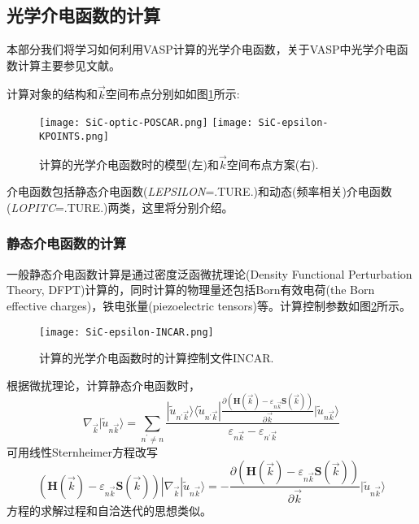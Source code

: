 \subsection{光学介电函数的计算}
本部分我们将学习如何利用\textrm{VASP}计算的光学介电函数，关于\textrm{VASP}中光学介电函数计算主要参见文献。

计算对象的结构和$\vec k$空间布点分别如如图\ref{SiC-optic-Input}所示:
\begin{figure}[h!]
\centering
\texttt{[image: SiC-optic-POSCAR.png]}
\texttt{[image: SiC-epsilon-KPOINTS.png]}
\caption{\small \textrm{计算的光学介电函数时的模型(左)和$\vec k$空间布点方案(右).}}%
\label{SiC-optic-Input}
\end{figure}

介电函数包括静态介电函数(\textrm{\textit{LEPSILON}=.TURE.})和动态(频率相关)介电函数(\textrm{\textit{LOPITC}=.TURE.})两类，这里将分别介绍。
\subsubsection{\rm{静态介电函数的计算}}
一般静态介电函数计算是通过密度泛函微扰理论(\textrm{Density Functional Perturbation Theory, DFPT})计算的，同时计算的物理量还包括\textrm{Born}有效电荷(\textrm{the Born effective charges})，铁电张量(\textrm{piezoelectric tensors})等。计算控制参数如图\ref{SiC-Epsilon-INCAR}所示。
\begin{figure}[h!]
\centering
\texttt{[image: SiC-epsilon-INCAR.png]}
\caption{\small \textrm{计算的光学介电函数时的计算控制文件\textrm{INCAR}.}}%
\label{SiC-Epsilon-INCAR}
\end{figure}

根据微扰理论，计算静态介电函数时，
\begin{displaymath}
	\nabla_{\vec k}|\tilde u_{n\vec k}\rangle=\sum_{n^{\prime}\neq n}\dfrac{|\tilde u_{n^{\prime}\vec k}\rangle\langle\tilde u_{n^{\prime}\vec k}|\frac{\partial(\mathbf{H}(\vec k)-\varepsilon_{n\vec k}\mathbf{S}(\vec k))}{\partial\vec k}|\tilde u_{n\vec k}\rangle}{\varepsilon_{n\vec k}-\varepsilon_{n^{\prime}\vec k}}
\end{displaymath}
可用线性\textrm{Sternheimer}方程改写
\begin{displaymath}
	(\mathbf{H}(\vec k)-\varepsilon_{n\vec k}\mathbf{S}(\vec k))|\nabla_{\vec k}|\tilde u_{n\vec k}\rangle=-\dfrac{\partial(\mathbf{H}(\vec k)-\varepsilon_{n\vec k}\mathbf{S}(\vec k))}{\partial\vec k}|\tilde u_{n\vec k}\rangle
\end{displaymath}
方程的求解过程和自洽迭代的思想类似。

